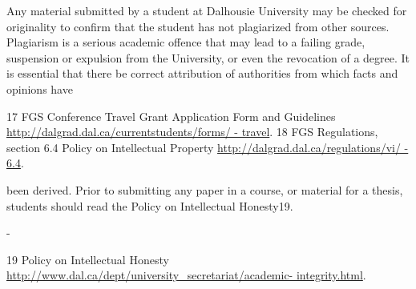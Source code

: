 \documentclass{article}
\newcommand\elink[1]{\url{#1}}
\begin{document}
Any material submitted by a student at Dalhousie University may be checked for originality to confirm that the student has not plagiarized from other sources. Plagiarism is a serious academic offence that may lead to a failing grade, suspension or expulsion from the University, or even the revocation of a degree.  It is essential that there be correct attribution of authorities from which facts and opinions have




17 FGS Conference Travel Grant Application Form and Guidelines \elink{http://dalgrad.dal.ca/currentstudents/forms/ - travel}.
18 FGS Regulations, section 6.4 Policy on Intellectual Property \elink{http://dalgrad.dal.ca/regulations/vi/ - 6.4}.
 

been derived. Prior to submitting any paper in a course, or material for a thesis, students should read the Policy on Intellectual Honesty19.





-










































19 Policy on Intellectual Honesty \elink{http://www.dal.ca/dept/university_secretariat/academic- integrity.html}.
 
\printindex
\end{document}
